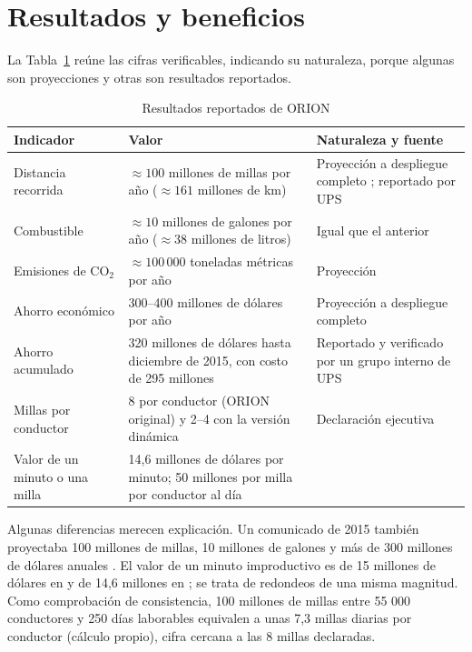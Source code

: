 \documentclass[11pt,a4paper]{article}
\begin{document}
\section{Resultados y beneficios}
La Tabla~\ref{tab:resultados} reúne las cifras verificables, indicando su naturaleza, porque algunas son proyecciones y otras son resultados reportados.

\begin{table}[ht]
\centering\small
\caption{Resultados reportados de ORION}
\label{tab:resultados}
\begin{tabularx}{\textwidth}{@{}>{\raggedright\arraybackslash}p{3.3cm} X >{\raggedright\arraybackslash}p{3.6cm}@{}}
\toprule
Indicador & Valor & Naturaleza y fuente \\
\midrule
Distancia recorrida & $\approx 100$ millones de millas por año ($\approx 161$ millones de km) & Proyección a despliegue completo \parencite{holland2017}; reportado por UPS \parencite{ups2020} \\
Combustible & $\approx 10$ millones de galones por año ($\approx 38$ millones de litros) & Igual que el anterior \\
Emisiones de CO$_2$ & $\approx 100\,000$ toneladas métricas por año & Proyección \parencite{holland2017} \\
Ahorro económico & 300--400 millones de dólares por año & Proyección a despliegue completo \parencite{holland2017} \\
Ahorro acumulado & 320 millones de dólares hasta diciembre de 2015, con costo de 295 millones & Reportado y verificado por un grupo interno de UPS \parencite{holland2017} \\
Millas por conductor & 8 por conductor (ORION original) y 2--4 con la versión dinámica & Declaración ejecutiva \parencite{leonard2021} \\
Valor de un minuto o una milla & 14,6 millones de dólares por minuto; 50 millones por milla por conductor al día & \textcite{clevenger2016} \\
\bottomrule
\end{tabularx}
\end{table}

Algunas diferencias merecen explicación. Un comunicado de 2015 también proyectaba 100 millones de millas, 10 millones de galones y más de 300 millones de dólares anuales \parencite{ups2015}. El valor de un minuto improductivo es de 15 millones de dólares en \textcite{holland2017} y de 14,6 millones en \textcite{clevenger2016}; se trata de redondeos de una misma magnitud. Como comprobación de consistencia, 100 millones de millas entre 55 000 conductores y 250 días laborables equivalen a unas 7,3 millas diarias por conductor (cálculo propio), cifra cercana a las 8 millas declaradas.
\end{document}
